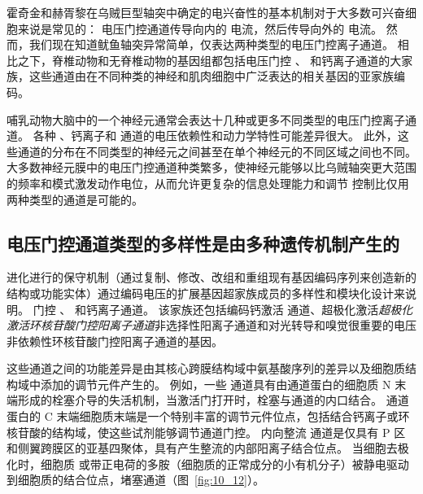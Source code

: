 霍奇金和赫胥黎在乌贼巨型轴突中确定的电兴奋性的基本机制对于大多数可兴奋细胞来说是常见的：
电压门控通道传导向内的  电流，然后传导向外的  电流。
然而，我们现在知道鱿鱼轴突异常简单，仅表达两种类型的电压门控离子通道。
相比之下，脊椎动物和无脊椎动物的基因组都包括电压门控 、 和钙离子通道的大家族，这些通道由在不同种类的神经和肌肉细胞中广泛表达的相关基因的亚家族编码。


哺乳动物大脑中的一个神经元通常会表达十几种或更多不同类型的电压门控离子通道。
各种 、钙离子和  通道的电压依赖性和动力学特性可能差异很大。
此外，这些通道的分布在不同类型的神经元之间甚至在单个神经元的不同区域之间也不同。
大多数神经元膜中的电压门控通道种类繁多，使神经元能够以比乌贼轴突更大范围的频率和模式激发动作电位，从而允许更复杂的信息处理能力和调节 控制比仅用两种类型的通道是可能的。



\subsection{电压门控通道类型的多样性是由多种遗传机制产生的}

进化进行的保守机制（通过复制、修改、改组和重组现有基因编码序列来创造新的结构或功能实体）通过编码电压的扩展基因超家族成员的多样性和模块化设计来说明。 
门控 、 和钙离子通道。
该家族还包括编码钙激活  通道、超极化激活\textit{超极化激活环核苷酸门控阳离子通道}非选择性阳离子通道和对光转导和嗅觉很重要的电压非依赖性环核苷酸门控阳离子通道的基因。


这些通道之间的功能差异是由其核心跨膜结构域中氨基酸序列的差异以及细胞质结构域中添加的调节元件产生的。 
例如，一些  通道具有由通道蛋白的细胞质 N 末端形成的栓塞介导的失活机制，当激活门打开时，栓塞与通道的内口结合。
通道蛋白的 C 末端细胞质末端是一个特别丰富的调节元件位点，包括结合钙离子或环核苷酸的结构域，使这些试剂能够调节通道门控。
内向整流  通道是仅具有 P 区和侧翼跨膜区的亚基四聚体，具有产生整流的内部阳离子结合位点。
当细胞去极化时，细胞质  或带正电荷的多胺（细胞质的正常成分的小有机分子）被静电驱动到细胞质的结合位点，堵塞通道（图~\ref{fig:10_12}）。



